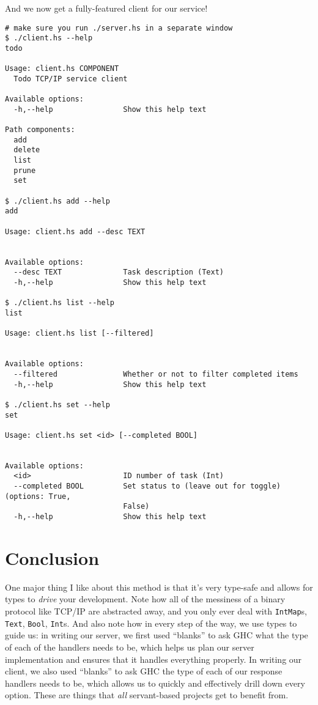 \documentclass[]{article}
\begin{document}
And we now get a fully-featured client for our service!

\begin{verbatim}
# make sure you run ./server.hs in a separate window
$ ./client.hs --help
todo

Usage: client.hs COMPONENT
  Todo TCP/IP service client

Available options:
  -h,--help                Show this help text

Path components:
  add
  delete
  list
  prune
  set

$ ./client.hs add --help
add

Usage: client.hs add --desc TEXT


Available options:
  --desc TEXT              Task description (Text)
  -h,--help                Show this help text

$ ./client.hs list --help
list

Usage: client.hs list [--filtered]


Available options:
  --filtered               Whether or not to filter completed items
  -h,--help                Show this help text

$ ./client.hs set --help
set

Usage: client.hs set <id> [--completed BOOL]


Available options:
  <id>                     ID number of task (Int)
  --completed BOOL         Set status to (leave out for toggle) (options: True,
                           False)
  -h,--help                Show this help text
\end{verbatim}

\hypertarget{conclusion}{%
\section{Conclusion}\label{conclusion}}

One major thing I like about this method is that it's very type-safe and allows
for types to \emph{drive} your development. Note how all of the messiness of a
binary protocol like TCP/IP are abstracted away, and you only ever deal with
\texttt{IntMap}s, \texttt{Text}, \texttt{Bool}, \texttt{Int}s. And also note how
in every step of the way, we use types to guide us: in writing our server, we
first used ``blanks'' to ask GHC what the type of each of the handlers needs to
be, which helps us plan our server implementation and ensures that it handles
everything properly. In writing our client, we also used ``blanks'' to ask GHC
the type of each of our response handlers needs to be, which allows us to
quickly and effectively drill down every option. These are things that
\emph{all} servant-based projects get to benefit from.
\end{document}
